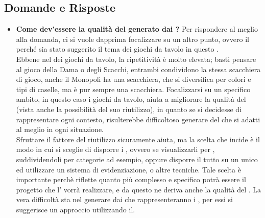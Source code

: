 	  \subsection{Domande e Risposte}
	   \begin{itemize}
	   
	   	\item 
	   		\textbf{Come dev'essere la qualità del  generato dai ?}
	    	\justifying     		
Per rispondere al meglio alla domanda, ci si vuole dapprima focalizzare su un altro punto, ovvero il perché sia stato suggerito il tema dei giochi da tavolo in questo .\\
Ebbene nel  dei giochi da tavolo, la ripetitività è molto elevata; basti pensare al gioco della Dama o degli Scacchi, entrambi condividono la stessa scacchiera di gioco, anche il Monopoli ha una scacchiera, che si diversifica per colori e tipi di caselle, ma è pur sempre una scacchiera. Focalizzarsi su un specifico ambito, in questo caso i giochi da tavolo, aiuta a migliorare la qualità del  (vista anche la possibilità del suo riutilizzo), in quanto se si decidesse di rappresentare ogni contesto, risulterebbe difficoltoso generare del  che si adatti al meglio in ogni situazione.\\Sfruttare il fattore del riutilizzo sicuramente aiuta, ma la scelta che incide è il modo in cui si sceglie di disporre i , ovvero se visualizzarli per , suddividendoli per categorie ad esempio, oppure disporre il tutto su un unico  ed utilizzare un sistema di evidenziazione,  o altre tecniche. Tale scelta è importante perchè riflette quanto più complesso e specifico potrà essere il progetto che l' vorrà realizzare, e da questo ne deriva anche la qualità del .
      		La vera difficoltà sta nel generare  dai  che rappresenteranno i , per essi si suggerisce un approccio utilizzando il.\\


\end{itemize}
